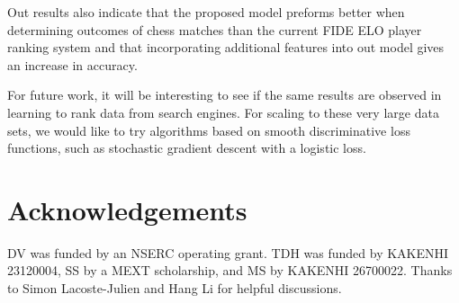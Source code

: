 \documentclass[twoside,11pt]{article}
\begin{document}
Out results also indicate that the proposed model preforms better when determining outcomes of chess matches than the current FIDE ELO player ranking system and that incorporating additional features into out model gives an increase in accuracy.

For future work, it will be interesting to see if the same results are
observed in learning to rank data from search engines. For scaling to
these very large data sets, we would like to try algorithms based on
smooth discriminative loss functions, such as stochastic gradient
descent with a logistic loss.

\section*{Acknowledgements}
DV was funded by an NSERC operating grant. TDH was funded by KAKENHI 23120004, SS by a
MEXT scholarship, and MS by KAKENHI 26700022. 
Thanks%
 to Simon Lacoste-Julien and Hang Li for helpful discussions.




\end{document}
